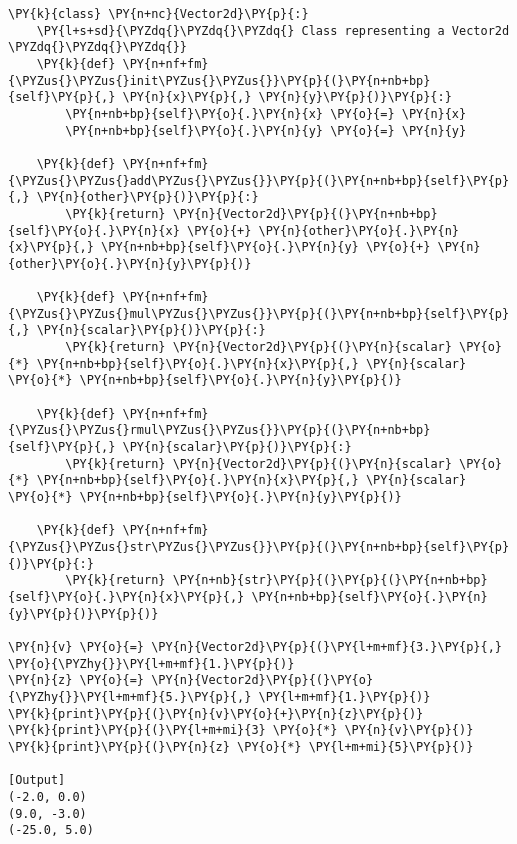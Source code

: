 \begin{Verbatim}[label=\makebox{\url{https://bitbucket.org/lbaldini/programming/src/tip/snippets/vector2d\_4.py}},commandchars=\\\{\}]
\PY{k}{class} \PY{n+nc}{Vector2d}\PY{p}{:}
    \PY{l+s+sd}{\PYZdq{}\PYZdq{}\PYZdq{} Class representing a Vector2d \PYZdq{}\PYZdq{}\PYZdq{}}   
    \PY{k}{def} \PY{n+nf+fm}{\PYZus{}\PYZus{}init\PYZus{}\PYZus{}}\PY{p}{(}\PY{n+nb+bp}{self}\PY{p}{,} \PY{n}{x}\PY{p}{,} \PY{n}{y}\PY{p}{)}\PY{p}{:}
        \PY{n+nb+bp}{self}\PY{o}{.}\PY{n}{x} \PY{o}{=} \PY{n}{x}
        \PY{n+nb+bp}{self}\PY{o}{.}\PY{n}{y} \PY{o}{=} \PY{n}{y}
   
    \PY{k}{def} \PY{n+nf+fm}{\PYZus{}\PYZus{}add\PYZus{}\PYZus{}}\PY{p}{(}\PY{n+nb+bp}{self}\PY{p}{,} \PY{n}{other}\PY{p}{)}\PY{p}{:}
        \PY{k}{return} \PY{n}{Vector2d}\PY{p}{(}\PY{n+nb+bp}{self}\PY{o}{.}\PY{n}{x} \PY{o}{+} \PY{n}{other}\PY{o}{.}\PY{n}{x}\PY{p}{,} \PY{n+nb+bp}{self}\PY{o}{.}\PY{n}{y} \PY{o}{+} \PY{n}{other}\PY{o}{.}\PY{n}{y}\PY{p}{)}
    
    \PY{k}{def} \PY{n+nf+fm}{\PYZus{}\PYZus{}mul\PYZus{}\PYZus{}}\PY{p}{(}\PY{n+nb+bp}{self}\PY{p}{,} \PY{n}{scalar}\PY{p}{)}\PY{p}{:}
        \PY{k}{return} \PY{n}{Vector2d}\PY{p}{(}\PY{n}{scalar} \PY{o}{*} \PY{n+nb+bp}{self}\PY{o}{.}\PY{n}{x}\PY{p}{,} \PY{n}{scalar} \PY{o}{*} \PY{n+nb+bp}{self}\PY{o}{.}\PY{n}{y}\PY{p}{)}
        
    \PY{k}{def} \PY{n+nf+fm}{\PYZus{}\PYZus{}rmul\PYZus{}\PYZus{}}\PY{p}{(}\PY{n+nb+bp}{self}\PY{p}{,} \PY{n}{scalar}\PY{p}{)}\PY{p}{:}
        \PY{k}{return} \PY{n}{Vector2d}\PY{p}{(}\PY{n}{scalar} \PY{o}{*} \PY{n+nb+bp}{self}\PY{o}{.}\PY{n}{x}\PY{p}{,} \PY{n}{scalar} \PY{o}{*} \PY{n+nb+bp}{self}\PY{o}{.}\PY{n}{y}\PY{p}{)}
        
    \PY{k}{def} \PY{n+nf+fm}{\PYZus{}\PYZus{}str\PYZus{}\PYZus{}}\PY{p}{(}\PY{n+nb+bp}{self}\PY{p}{)}\PY{p}{:}
        \PY{k}{return} \PY{n+nb}{str}\PY{p}{(}\PY{p}{(}\PY{n+nb+bp}{self}\PY{o}{.}\PY{n}{x}\PY{p}{,} \PY{n+nb+bp}{self}\PY{o}{.}\PY{n}{y}\PY{p}{)}\PY{p}{)}
     
\PY{n}{v} \PY{o}{=} \PY{n}{Vector2d}\PY{p}{(}\PY{l+m+mf}{3.}\PY{p}{,} \PY{o}{\PYZhy{}}\PY{l+m+mf}{1.}\PY{p}{)}
\PY{n}{z} \PY{o}{=} \PY{n}{Vector2d}\PY{p}{(}\PY{o}{\PYZhy{}}\PY{l+m+mf}{5.}\PY{p}{,} \PY{l+m+mf}{1.}\PY{p}{)}
\PY{k}{print}\PY{p}{(}\PY{n}{v}\PY{o}{+}\PY{n}{z}\PY{p}{)}
\PY{k}{print}\PY{p}{(}\PY{l+m+mi}{3} \PY{o}{*} \PY{n}{v}\PY{p}{)}
\PY{k}{print}\PY{p}{(}\PY{n}{z} \PY{o}{*} \PY{l+m+mi}{5}\PY{p}{)}

[Output]
(-2.0, 0.0)
(9.0, -3.0)
(-25.0, 5.0)
\end{Verbatim}